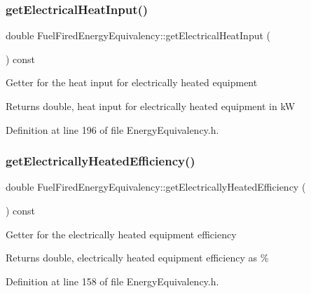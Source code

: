 \subsubsection{\texorpdfstring{get\+Electrical\+Heat\+Input()}{getElectricalHeatInput()}}
{\footnotesize\ttfamily double Fuel\+Fired\+Energy\+Equivalency\+::get\+Electrical\+Heat\+Input (\begin{DoxyParamCaption}{ }\end{DoxyParamCaption}) const\hspace{0.3cm}{\ttfamily [inline]}}

Getter for the heat input for electrically heated equipment

\begin{DoxyReturn}{Returns}
double, heat input for electrically heated equipment in kW 
\end{DoxyReturn}


Definition at line 196 of file Energy\+Equivalency.\+h.

\mbox{\label{class_fuel_fired_energy_equivalency_ad4bd750677313895d8345c7eaf8308bd}} 
\subsubsection{\texorpdfstring{get\+Electrically\+Heated\+Efficiency()}{getElectricallyHeatedEfficiency()}}
{\footnotesize\ttfamily double Fuel\+Fired\+Energy\+Equivalency\+::get\+Electrically\+Heated\+Efficiency (\begin{DoxyParamCaption}{ }\end{DoxyParamCaption}) const\hspace{0.3cm}{\ttfamily [inline]}}

Getter for the electrically heated equipment efficiency

\begin{DoxyReturn}{Returns}
double, electrically heated equipment efficiency as \% 
\end{DoxyReturn}


Definition at line 158 of file Energy\+Equivalency.\+h.

\mbox{\label{class_fuel_fired_energy_equivalency_ac8695c1fe3dcffeab60b5305239d2a58}} 
